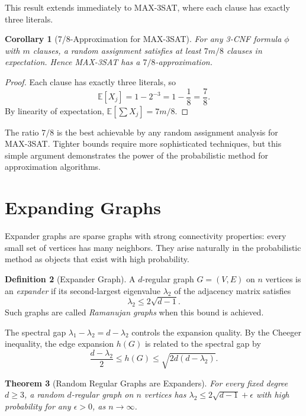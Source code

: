 \documentclass[twoside,12pt]{book}
\theoremstyle{plain}
\newtheorem{theorem}{Theorem}[chapter]
\newtheorem{corollary}[theorem]{Corollary}
\theoremstyle{definition}
\newtheorem{definition}[theorem]{Definition}
\theoremstyle{remark}
\begin{document}
This result extends immediately to MAX-3SAT, where each clause has exactly
three literals.

\begin{corollary}[7/8-Approximation for MAX-3SAT]
\label{cor:max3sat}
For any 3-CNF formula $\phi$ with $m$ clauses, a random assignment satisfies
at least $7m/8$ clauses in expectation. Hence MAX-3SAT has a
$7/8$-approximation.
\end{corollary}

\begin{proof}
Each clause has exactly three literals, so
\[
\mathbb{E}[X_j] = 1 - 2^{-3} = 1 - \frac{1}{8} = \frac{7}{8}.
\]
By linearity of expectation, $\mathbb{E}[\sum X_j] = 7m/8$.
\end{proof}

The ratio $7/8$ is the best achievable by any random assignment analysis
for MAX-3SAT. Tighter bounds require more sophisticated techniques, but
this simple argument demonstrates the power of the probabilistic method
for approximation algorithms.

\section{Expanding Graphs}
\label{sec:expanders}

Expander graphs are sparse graphs with strong connectivity properties:
every small set of vertices has many neighbors. They arise naturally in
the probabilistic method as objects that exist with high probability.

\begin{definition}[Expander Graph]
A $d$-regular graph $G = (V, E)$ on $n$ vertices is an \emph{expander} if
its second-largest eigenvalue $\lambda_2$ of the adjacency matrix satisfies
\[
\lambda_2 \leq 2\sqrt{d - 1}.
\]
Such graphs are called \emph{Ramanujan graphs} when this bound is achieved.
\end{definition}

The spectral gap $\lambda_1 - \lambda_2 = d - \lambda_2$ controls the
expansion quality. By the Cheeger inequality, the edge expansion $h(G)$
is related to the spectral gap by
\[
\frac{d - \lambda_2}{2} \leq h(G) \leq \sqrt{2d(d - \lambda_2)}.
\]

\begin{theorem}[Random Regular Graphs are Expanders]
\label{thm:random-expander}
For every fixed degree $d \geq 3$, a random $d$-regular graph on $n$
vertices has $\lambda_2 \leq 2\sqrt{d-1} + \epsilon$ with high probability
for any $\epsilon > 0$, as $n \to \infty$.
\end{theorem}
\end{document}
